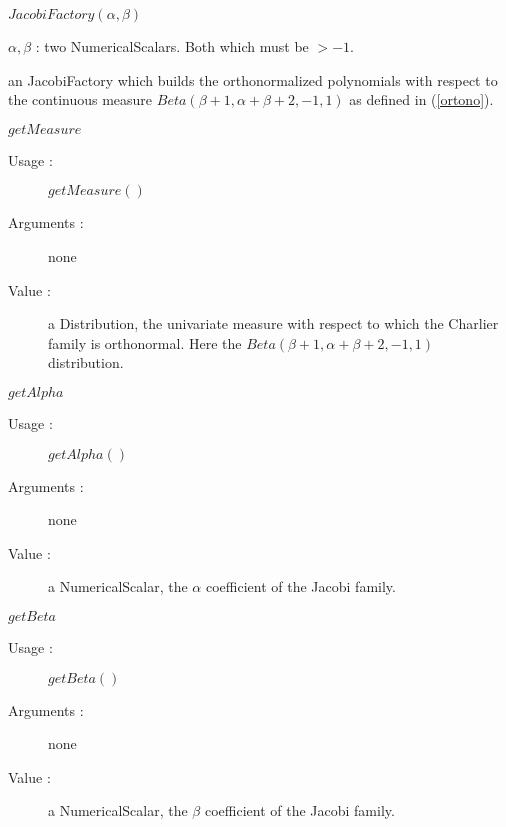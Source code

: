 \begin{description}
\item[Usage :] $JacobiFactory(\alpha,\beta)$


\item[Arguments :]  $\alpha, \beta$ : two NumericalScalars. Both which must be $> -1$.

\item[Value :]  an JacobiFactory  which builds the orthonormalized polynomials with respect to the continuous measure $Beta(\beta + 1, \alpha + \beta + 2, -1, 1)$ as defined in (\ref{ortono}).

\item[Some methods :]  \rule{0pt}{1em}

  \begin{description}
  \item $getMeasure$
    \begin{description}
    \item[Usage :] $getMeasure()$
    \item[Arguments :] none
    \item[Value :]  a Distribution, the univariate measure with respect to which the Charlier family is orthonormal. Here the $Beta(\beta + 1, \alpha + \beta + 2, -1, 1)$ distribution.
    \end{description}
    \bigskip

  \item $getAlpha$
    \begin{description}
    \item[Usage :] $getAlpha()$
    \item[Arguments :] none
    \item[Value :]  a NumericalScalar, the $\alpha$ coefficient of the Jacobi family.
    \end{description}
    \bigskip

  \item $getBeta$
    \begin{description}
    \item[Usage :] $getBeta()$
    \item[Arguments :] none
    \item[Value :]  a NumericalScalar, the $\beta$ coefficient of the Jacobi family.
    \end{description}

  \end{description}
\end{description}

\newpage
